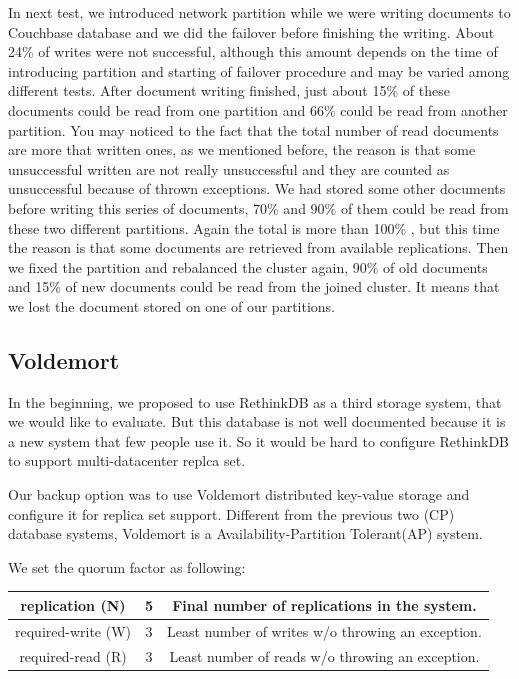 \documentclass[a4paper]{article}
\begin{document}
In next test, we introduced network partition while we were writing documents to Couchbase database and we did the failover before finishing the writing. 
About 24\% of writes were not successful, although this amount depends on the time of introducing partition and starting of failover procedure and may be varied among different tests.
After document writing finished, just about 15\% of these documents could be read from one partition and 66\% could be read from another partition.
You may noticed to the fact that the total number of read documents are more that written ones, as we mentioned before, the reason is that some unsuccessful written are not really unsuccessful and they are counted as unsuccessful because of thrown exceptions. 
We had stored some other documents before writing this series of documents, 70\% and 90\% of them could be read from these two different partitions.
Again the total is more than 100\% , but this time the reason is that some documents are retrieved from available replications. 
Then we fixed the partition and rebalanced the cluster again, 90\% of old documents and 15\% of new documents could be read from the joined cluster.
It means that we lost the document stored on one of our partitions.

\subsection{Voldemort}

In the beginning, we proposed to use RethinkDB as a third storage system, that we would like to evaluate. But this database is not well documented because it is a new system that few people use it. So it would be hard to configure RethinkDB to support multi-datacenter replca set.

Our backup option was to use Voldemort distributed key-value storage and configure it for replica set support. Different from the previous two (CP) database systems, Voldemort is a Availability-Partition Tolerant(AP) system. 

We set the quorum factor as following:

\begin{table}[hb]
  \centering
  \begin{tabular}{|c|c|c|}
    \hline
    replication (N) & 5 & Final number of replications in the system. \\
    \hline
    required-write (W) & 3 & Least number of writes w/o throwing an exception. \\
    \hline
    required-read (R) & 3 & Least number of reads w/o throwing an exception. \\
    \hline
  \end{tabular}
\end{table}
\end{document}
